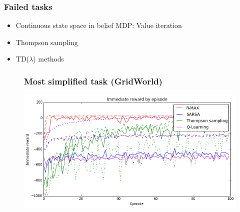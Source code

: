 \documentclass[10pt, compress]{beamer}
\begin{document}
\begin{frame}[fragile]
  \frametitle{Failed tasks}

  \begin{itemize}
  \item Continuous state space in belief MDP: Value iteration
  \item Thompson sampling
  \item TD($\lambda$) methods
  \end{itemize}
\end{frame}

\begin{frame}
\begin{figure}[ht]
  \frametitle{Most simplified task (GridWorld)}
  \vspace{3ex}
  \begin{center}
  \centerline{\includegraphics[width=1.1\textwidth]{img/mdp_imm_rewards.png}}
  \end{center}
  \end{figure}
\end{frame}

\end{document}
